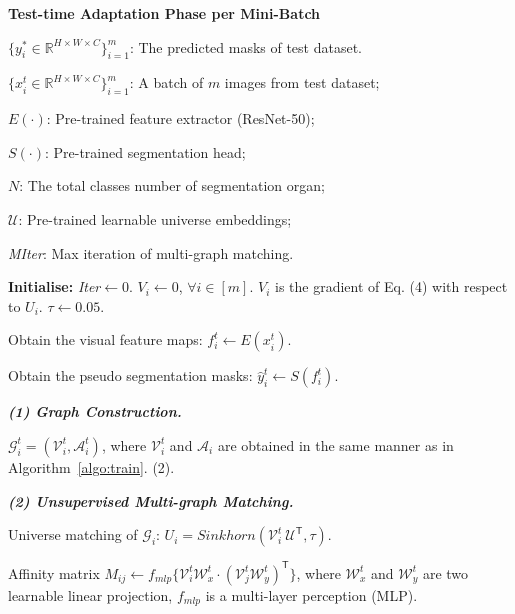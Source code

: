 \begin{algorithm*}
    \caption{\textbf{Test-time Adaptation Phase per Mini-Batch}}
    \renewcommand{\algorithmicrequire}{\textbf{Input:}}     \renewcommand{\algorithmicensure}{\textbf{Output:}}
    
    \begin{algorithmic}[1]
        \ENSURE 
        $\{y^{*}_i \in \mathbb{R}^{H\times W\times C} \}_{i=1}^m$: The predicted masks of test dataset.
        
        
        \REQUIRE 
        $\{ x_i^t \in \mathbb{R}^{H\times W\times C} \}_{i=1}^m$: A batch of $m$ images from test dataset;


        $E(\cdot)$: Pre-trained feature extractor (ResNet-50);

        $S(\cdot)$: Pre-trained segmentation head;

        $N$: The total classes number of segmentation organ;

        $\mathcal{U}$: Pre-trained learnable universe embeddings;

        \textit{MIter}: Max iteration of multi-graph matching.

        \STATE \textbf{Initialise:} \textit{Iter}$\leftarrow 0$. ${V}_i \leftarrow 0$, $\forall i \in [m]$. ${V}_i$ is the gradient of Eq. (4) with respect to ${U}_i$. $\tau \leftarrow 0.05$.

        \STATE Obtain the visual feature maps: $f_i^t \leftarrow E(x_i^t).$

        \STATE Obtain the pseudo segmentation masks: $\hat{y}^t_i \leftarrow S(f_i^t).$

        \textit{\textbf{(1) Graph Construction.}}

        \STATE $ \mathcal{G}_i^t = (\mathcal{V}_i^t, \mathcal{A}_i^t)$, where $\mathcal{V}_i^t$ and $\mathcal{A}_i$ are obtained in the same manner as in Algorithm~\ref{algo:train}. (2).

        \textit{\textbf{(2) Unsupervised Multi-graph Matching.}}

        \STATE Universe matching of $\mathcal{G}_i$: $U_i = Sinkhorn(\mathcal{V}_i^t \ \mathcal{U}^{\mathsf{T}}, \tau)$.

        \STATE Affinity matrix $M_{ij} \leftarrow f_{mlp}\{\mathcal{V}_i^t \mathcal{W}_{x}^t\cdot(\mathcal{V}_j^t \mathcal{W}_{y}^t)^{\mathsf{T}}\}$, where $\mathcal{W}_{x}^t$ and $\mathcal{W}_{y}^t$ are two learnable linear projection, $f_{mlp}$ is a multi-layer perception (MLP).


\end{algorithmic}
\end{algorithm*}

